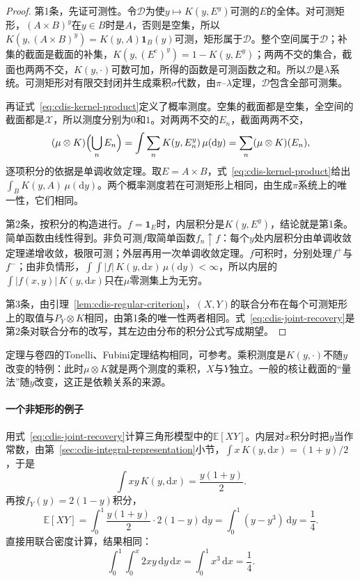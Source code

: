 \begin{proof}
第1条，先证可测性。令$\mathcal{D}$为使$y\mapsto K(y,E^{y})$可测的$E$的全体。对可测矩形，$(A\times B)^{y}$在$y\in B$时是$A$，否则是空集，所以$K(y,(A\times B)^{y})=K(y,A)\mathbf{1}_{B}(y)$可测，矩形属于$\mathcal{D}$。整个空间属于$\mathcal{D}$；补集的截面是截面的补集，$K(y,(E^{\mathrm{c}})^{y})=1-K(y,E^{y})$；两两不交的集合，截面也两两不交，$K(y,\cdot)$可数可加，所得的函数是可测函数之和。所以$\mathcal{D}$是$\lambda$系统。可测矩形对有限交封闭并生成乘积$\sigma$代数，由$\pi$--$\lambda$定理，$\mathcal{D}$包含全部可测集。

再证式~\eqref{eq:cdis-kernel-product}定义了概率测度。空集的截面都是空集，全空间的截面都是$\mathcal{X}$，所以测度分别为$0$和$1$。对两两不交的$E_n$，截面两两不交，
\[
 (\mu\otimes K)\Bigl(\bigcup_nE_n\Bigr)=\int\sum_{n}K(y,E_n^{y})\,\mu(\mathrm{d}y)=\sum_{n}(\mu\otimes K)(E_n),
\]
逐项积分的依据是单调收敛定理。取$E=A\times B$，式~\eqref{eq:cdis-kernel-product}给出$\int_{B}K(y,A)\,\mu(\mathrm{d}y)$。两个概率测度若在可测矩形上相同，由生成$\pi$系统上的唯一性，它们相同。

第2条，按积分的构造进行。$f=\mathbf{1}_{E}$时，内层积分是$K(y,E^{y})$，结论就是第1条。简单函数由线性得到。非负可测$f$取简单函数$f_n\uparrow f$：每个$y$处内层积分由单调收敛定理递增收敛，极限可测；外层再用一次单调收敛定理。$f$可积时，分别处理$f^{+}$与$f^{-}$；由非负情形，$\int\!\int\lvert f\rvert\,K(y,\mathrm{d}x)\,\mu(\mathrm{d}y)<\infty$，所以内层的$\int\lvert f(x,y)\rvert\,K(y,\mathrm{d}x)$只在$\mu$零测集上为无穷。

第3条，由引理~\ref{lem:cdis-regular-criterion}，$(X,Y)$的联合分布在每个可测矩形上的取值与$P_Y\otimes K$相同，由第1条的唯一性两者相同。式~\eqref{eq:cdis-joint-recovery}是第2条对联合分布的改写，其左边由分布的积分公式写成期望。
\end{proof}

定理与卷四的Tonelli、Fubini定理结构相同，可参考。乘积测度是$K(y,\cdot)$不随$y$改变的特例：此时$\mu\otimes K$就是两个测度的乘积，$X$与$Y$独立。一般的核让截面的“量法”随$y$改变，这正是依赖关系的来源。

\paragraph{一个非矩形的例子}
用式~\eqref{eq:cdis-joint-recovery}计算三角形模型中的$\mathbb{E}[XY]$。内层对$x$积分时把$y$当作常数，由第~\ref{sec:cdis-integral-representation}小节，$\int x\,K(y,\mathrm{d}x)=(1+y)/2$，于是
\[
 \int x y\,K(y,\mathrm{d}x)=\frac{y(1+y)}{2}.
\]
再按$f_Y(y)=2(1-y)$积分，
\[
 \mathbb{E}[XY]=\int_0^1\frac{y(1+y)}{2}\cdot2(1-y)\,\mathrm{d}y=\int_0^1(y-y^{3})\,\mathrm{d}y=\frac14 .
\]
直接用联合密度计算，结果相同：
\[
 \int_0^1\int_0^{x}2xy\,\mathrm{d}y\,\mathrm{d}x=\int_0^1x^{3}\,\mathrm{d}x=\frac14 .
\]

